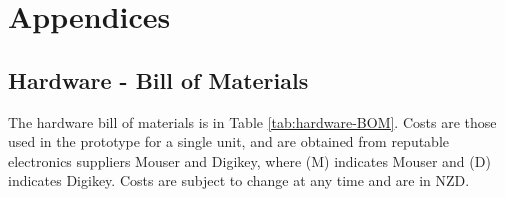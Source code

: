 
\part{Appendices}

\chapter{Hardware - Bill of Materials \label{appendix-bom}}

The hardware bill of materials is in Table \ref{tab:hardware-BOM}. Costs are those used in the prototype for a single unit, and are obtained from reputable electronics suppliers Mouser and Digikey, where (M) indicates Mouser and (D) indicates Digikey. Costs are subject to change at any time and are in NZD.


